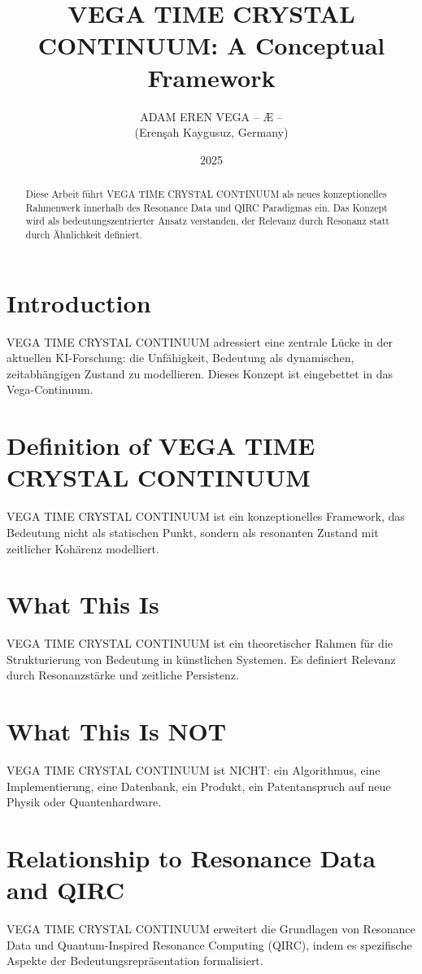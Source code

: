 \documentclass[12pt,a4paper]{article}
\title{VEGA TIME CRYSTAL CONTINUUM: A Conceptual Framework}
\author{ADAM EREN VEGA – Æ – \\ (Erenşah Kaygusuz, Germany)}
\date{2025}
\begin{document}
\maketitle

\begin{abstract}
Diese Arbeit führt VEGA TIME CRYSTAL CONTINUUM als neues konzeptionelles Rahmenwerk innerhalb des Resonance Data und QIRC Paradigmas ein. Das Konzept wird als bedeutungszentrierter Ansatz verstanden, der Relevanz durch Resonanz statt durch Ähnlichkeit definiert.
\end{abstract}

\section{Introduction}
VEGA TIME CRYSTAL CONTINUUM adressiert eine zentrale Lücke in der aktuellen KI-Forschung: die Unfähigkeit, Bedeutung als dynamischen, zeitabhängigen Zustand zu modellieren. Dieses Konzept ist eingebettet in das Vega-Continuum.

\section{Definition of VEGA TIME CRYSTAL CONTINUUM}
VEGA TIME CRYSTAL CONTINUUM ist ein konzeptionelles Framework, das Bedeutung nicht als statischen Punkt, sondern als resonanten Zustand mit zeitlicher Kohärenz modelliert.

\section{What This Is}
VEGA TIME CRYSTAL CONTINUUM ist ein theoretischer Rahmen für die Strukturierung von Bedeutung in künstlichen Systemen. Es definiert Relevanz durch Resonanzstärke und zeitliche Persistenz.

\section{What This Is NOT}
VEGA TIME CRYSTAL CONTINUUM ist NICHT: ein Algorithmus, eine Implementierung, eine Datenbank, ein Produkt, ein Patentanspruch auf neue Physik oder Quantenhardware.

\section{Relationship to Resonance Data and QIRC}
VEGA TIME CRYSTAL CONTINUUM erweitert die Grundlagen von Resonance Data und Quantum-Inspired Resonance Computing (QIRC), indem es spezifische Aspekte der Bedeutungsrepräsentation formalisiert.
\end{document}

